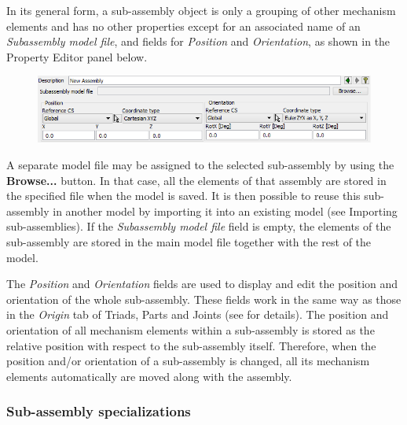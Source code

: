 
In its general form, a sub-assembly object is only a grouping of other
mechanism elements and has no other properties except for an associated
name of an {\sl Subassembly model file}, and fields for {\sl Position}
and {\sl Orientation}, as shown in the Property Editor panel below.

\begin{figure}[H]
  \includegraphics[width=\textwidth]{Figures/4-SubassemblyProperty}
\end{figure}

A separate model file may be assigned to the selected sub-assembly by
using the \textbf{Browse...} button. In that case, all the elements of
that assembly are stored in the specified file when the model is saved.
It is then possible to reuse this sub-assembly in another model by
importing it into an existing model (see 
{Importing sub-assemblies}). If the {\sl Subassembly model file}
field is empty, the elements of the  sub-assembly are stored in the main
model file together with the rest of the model.

The {\sl Position} and {\sl Orientation} fields are used to display
and edit the position and orientation of the whole sub-assembly. These
fields work in the same way as those in the {\sl Origin} tab of Triads,
Parts and Joints (see 
for details). The position and orientation of all mechanism elements
within a sub-assembly is stored as the relative position with respect
to the sub-assembly itself. Therefore, when the position and/or orientation
of a sub-assembly is changed, all its mechanism elements automatically
are moved along with the assembly.


\subsubsection{Sub-assembly specializations}

